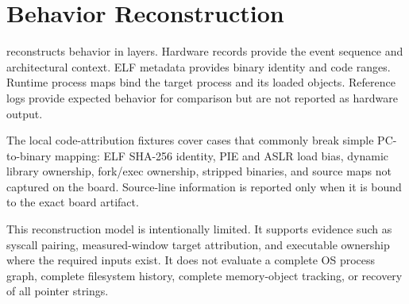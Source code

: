 \section{Behavior Reconstruction}

\rvmt reconstructs behavior in layers. Hardware records provide the event
sequence and architectural context. ELF metadata provides binary identity and
code ranges. Runtime process maps bind the target process and its loaded
objects. Reference logs provide expected behavior for comparison but are not
reported as hardware output.

The local code-attribution fixtures cover cases that commonly break simple
PC-to-binary mapping: ELF SHA-256 identity, PIE and ASLR load bias, dynamic
library ownership, fork/exec ownership, stripped binaries, and source maps not
captured on the board. Source-line information is reported only when it is
bound to the exact board artifact.

This reconstruction model is intentionally limited. It supports evidence such
as syscall pairing, measured-window target attribution, and executable
ownership where the required inputs exist. It does not evaluate a complete OS
process graph, complete filesystem history, complete memory-object tracking,
or recovery of all pointer strings.

